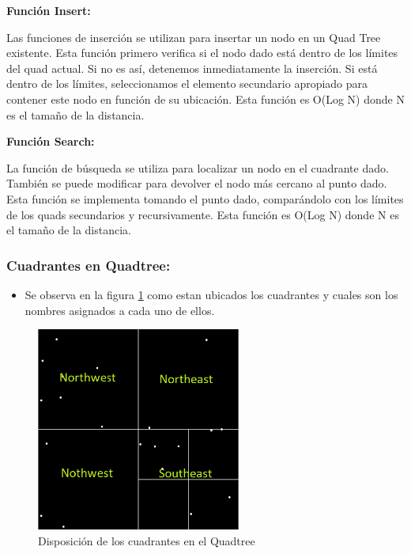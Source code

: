 \documentclass{article}
\begin{document}
\vspace{5mm}
\textbf{Función Insert:}

Las funciones de inserción se utilizan para insertar un nodo en un Quad Tree existente. Esta función primero verifica si el nodo dado está dentro de los límites del quad actual. Si no es así, detenemos inmediatamente la inserción. Si está dentro de los límites, seleccionamos el elemento secundario apropiado para contener este nodo en función de su ubicación. Esta función es O(Log N) donde N es el tamaño de la distancia.

\vspace{5mm}
\textbf{Función Search:}

La función de búsqueda se utiliza para localizar un nodo en el cuadrante dado. También se puede modificar para devolver el nodo más cercano al punto dado. Esta función se implementa tomando el punto dado, comparándolo con los límites de los quads secundarios y recursivamente. Esta función es O(Log N) donde N es el tamaño de la distancia.
\clearpage
\subsubsection{Cuadrantes en Quadtree: }
\begin{itemize}
    \item Se observa en la figura \ref{fig:quadtree_cuadrante} como estan ubicados los cuadrantes y cuales son los nombres asignados a cada uno de ellos.
\end{itemize}

\begin{figure}[h!]
\centering
\includegraphics[width=0.6\textwidth]{img/quadtree_cuadrante.png}
\caption{Disposición de los cuadrantes en el Quadtree}
\label{fig:quadtree_cuadrante}
\end{figure}
\end{document}
